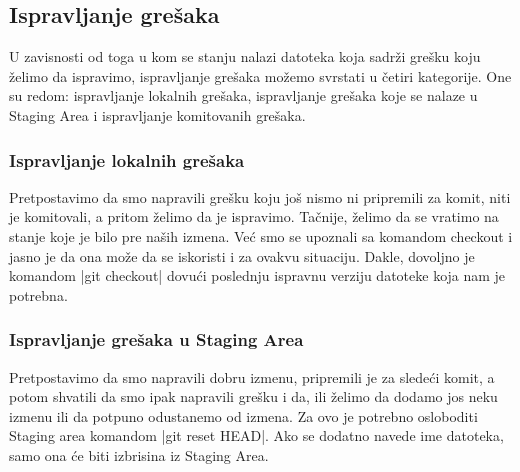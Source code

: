 \documentclass[a4paper]{article}
\begin{document}
{\subsection{Ispravljanje grešaka}
\label{subsec:greske}

U zavisnosti od toga u kom se stanju nalazi datoteka koja sadrži grešku koju želimo da ispravimo, ispravljanje grešaka možemo svrstati u četiri kategorije. One su redom: ispravljanje lokalnih grešaka, ispravljanje grešaka koje se nalaze u Staging Area i ispravljanje komitovanih grešaka.

\subsubsection*{Ispravljanje lokalnih grešaka}
\label{lokalne_greske}
Pretpostavimo da smo napravili grešku koju još nismo ni pripremili za komit, niti je komitovali, a pritom želimo da je ispravimo. Tačnije, želimo da se vratimo na stanje koje je bilo pre naših izmena. Već smo se upoznali sa komandom checkout i jasno je da ona može da se iskoristi i za ovakvu situaciju. Dakle, dovoljno je komandom |git checkout| dovući poslednju ispravnu verziju datoteke koja nam je potrebna.

\subsubsection*{Ispravljanje grešaka u Staging Area}
\label{staging_greske}

Pretpostavimo da smo napravili dobru izmenu, pripremili je za sledeći komit, a potom shvatili da smo ipak napravili grešku i da, ili želimo da dodamo jos neku izmenu ili da potpuno odustanemo od izmena. Za ovo je potrebno osloboditi Staging area komandom |git reset HEAD|. Ako se dodatno navede ime datoteka, samo ona će biti izbrisina iz Staging Area.

}
\end{document}
